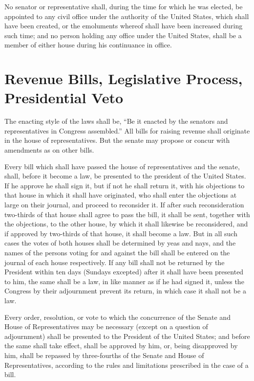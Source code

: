 \documentclass{constitution}
\begin{document}
No senator or representative shall, during the time for which he was elected, be appointed to any civil office under the authority of the United States, which shall have been created, or the emoluments whereof shall have been increased during such time;
and no person holding any office under the United States, shall be a member of either house during his continuance in office.

\section{Revenue Bills, Legislative Process, Presidential Veto}
The enacting style of the laws shall be,
“Be it enacted by the senators and representatives in Congress assembled.”
All bills for raising revenue shall originate in the house of representatives.
But the senate may propose or concur with amendments as on other bills.

Every bill which shall have passed the house of representatives and the senate, shall, before it become a law, be presented to the president of the United States.
If he approve he shall sign it,
but if not he shall return it, with his objections to that house in which it shall have originated,
who shall enter the objections at large on their journal, and proceed to reconsider it.
If after such reconsideration two-thirds of that house shall agree to pass the bill,
it shall be sent, together with the objections, to the other house, by which it shall likewise be reconsidered,
and if approved by two-thirds of that house, it shall become a law.
But in all such cases the votes of both houses shall be determined by yeas and nays,
and the names of the persons voting for and against the bill shall be entered on the journal of each house respectively.
If any bill shall not be returned by the President within ten days (Sundays excepted) after it shall have been presented to him,
the same shall be a law, in like manner as if he had signed it,
unless the Congress by their adjournment prevent its return,
in which case it shall not be a law.

Every order, resolution, or vote to which the concurrence of the Senate and House of Representatives may be necessary (except on a question of adjournment) shall be presented to the President of the United States;
and before the same shall take effect, shall be approved by him,
or, being disapproved by him, shall be repassed by three-fourths of the Senate and House of Representatives,
according to the rules and limitations prescribed in the case of a bill.
\end{document}
